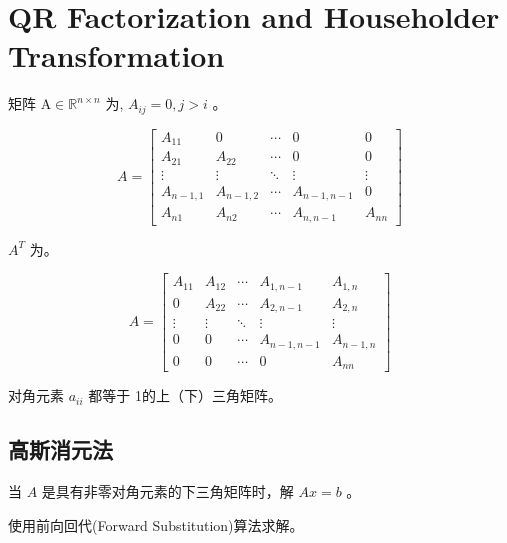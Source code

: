 \chapter{QR Factorization and Householder Transformation}

\begin{definition}
    矩阵 $ \mathrm{A} \in \mathbb{R}^{n \times n} $ 为, $ A_{i j}=0, j>i $ 。

    $$ A=\left[\begin{array}{ccccc}A_{11} & 0 & \cdots & 0 & 0 \\ A_{21} & A_{22} & \cdots & 0 & 0 \\ \vdots & \vdots & \ddots & \vdots & \vdots \\ A_{n-1,1} & A_{n-1,2} & \cdots & A_{n-1, n-1} & 0 \\ A_{n 1} & A_{n 2} & \cdots & A_{n, n-1} & A_{n n}\end{array}\right] $$
\end{definition}

\begin{definition}
    $ A^{T} $ 为。

    $$ A=\left[\begin{array}{ccccc}A_{11} & A_{12} & \cdots & A_{1, n-1} & A_{1, n} \\ 0 & A_{22} & \cdots & A_{2, n-1} & A_{2, n} \\ \vdots & \vdots & \ddots & \vdots & \vdots \\ 0 & 0 & \cdots & A_{n-1, n-1} & A_{n-1, n} \\ 0 & 0 & \cdots & 0 & A_{n n}\end{array}\right] $$
\end{definition}

\begin{definition}
    对角元素 $ a_{i i} $ 都等于 1的上（下）三角矩阵。
\end{definition}

\section{高斯消元法}

\begin{problem}
    当 $ A $ 是具有非零对角元素的下三角矩阵时，解 $ A x=b $ 。
\end{problem}

使用前向回代(Forward Substitution)算法求解。

